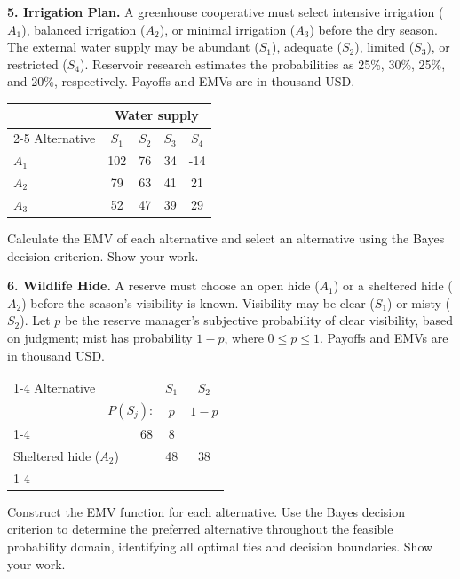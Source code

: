 \noindent\begin{minipage}[t][0.48\textheight][t]{\textwidth}
\textbf{5. Irrigation Plan.} A greenhouse cooperative must select intensive irrigation ($A_1$),
balanced irrigation ($A_2$), or minimal irrigation ($A_3$) before the dry
season. The external water supply may be abundant ($S_1$), adequate ($S_2$),
limited ($S_3$), or restricted ($S_4$). Reservoir research estimates the
probabilities as 25\%, 30\%, 25\%, and 20\%, respectively.
Payoffs and EMVs are in thousand USD.

\begin{center}
		\renewcommand{\arraystretch}{1.3}
		\small
		\begin{tabular}{lcccc}
			\toprule
			& \multicolumn{4}{c}{Water supply} \\
			\cmidrule(lr){2-5}
			Alternative & $S_1$ & $S_2$ & $S_3$ & $S_4$ \\
			\midrule
			$A_1$ & 102 & 76 & 34 & -14 \\
			$A_2$ & 79 & 63 & 41 & 21 \\
			$A_3$ & 52 & 47 & 39 & 29 \\
			\bottomrule
		\end{tabular}
	\end{center}

Calculate the EMV of each alternative and select an alternative using the Bayes decision criterion. Show your work.
\par\vfill
\end{minipage}\par

\noindent\begin{minipage}[t][0.48\textheight][t]{\textwidth}
\textbf{6. Wildlife Hide.} A reserve must choose an open hide ($A_1$) or a sheltered hide ($A_2$)
before the season's visibility is known. Visibility may be clear ($S_1$)
or misty ($S_2$). Let $p$ be the reserve manager's subjective probability
of clear visibility, based on judgment; mist has probability $1-p$,
where $0\leq p\leq1$. Payoffs and EMVs are in thousand USD.

\begin{center}
\renewcommand{\arraystretch}{1.3}\small
\begin{tabular}{lr@{\qquad}cc}
\cmidrule{1-4}
Alternative && $S_1$ & $S_2$ \\
& $P(S_j)$: & $p$ & $1-p$ \\
\cmidrule{1-4}
\multicolumn{2}{l}{Open hide ($A_1$)} & 68 & 8 \\
\multicolumn{2}{l}{Sheltered hide ($A_2$)} & 48 & 38 \\
\cmidrule{1-4}
\end{tabular}
\end{center}

Construct the EMV function for each alternative. Use the Bayes decision criterion to determine the preferred alternative throughout the feasible probability domain, identifying all optimal ties and decision boundaries. Show your work.
\par\vfill
\end{minipage}\par

